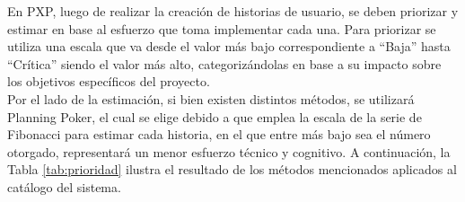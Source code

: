 En PXP, luego de realizar la creación de historias de usuario, se deben priorizar y estimar en base al esfuerzo que toma implementar cada una. Para priorizar se utiliza una escala que va desde el valor más bajo correspondiente a ``Baja'' hasta ``Crítica'' siendo el valor más alto, categorizándolas en base a su impacto sobre los objetivos específicos del proyecto.\\
\indent Por el lado de la estimación, si bien existen distintos métodos, se utilizará Planning Poker\cite{planningpoker}, el cual se elige debido a que emplea la escala de la serie de Fibonacci\cite{viggiani2006} para estimar cada historia, en el que entre más bajo sea el número otorgado, representará un menor esfuerzo técnico y cognitivo. A continuación, la Tabla \ref{tab:prioridad} ilustra el resultado de los métodos mencionados aplicados al catálogo del sistema.

